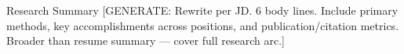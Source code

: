 \documentclass{cv}
\begin{document}
\vspace{-0.03cm}

%
%
%
%
%
%
%


\begin{rSection}{Research Summary}
[GENERATE: Rewrite per JD. 6 body lines. Include primary methods, key accomplishments across positions, and publication/citation metrics. Broader than resume summary — cover full research arc.]
\end{rSection}
\vspace{-0.01cm}

\end{document}
